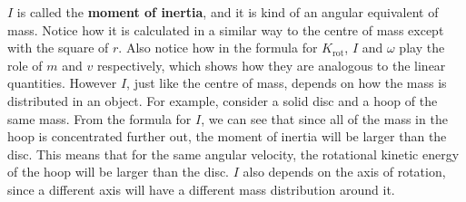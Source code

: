 \documentclass[../classical_mechanics.tex]{subfiles}
\begin{document}
            $I$ is called the \textbf{moment of inertia}, and it is kind of an angular equivalent of mass.
            Notice how it is calculated in a similar way to the centre of mass except with the square of $r$.
            Also notice how in the formula for $K_\text{rot}$, $I$ and $\omega$ play the role of $m$ and $v$ respectively, which shows how they are analogous to the linear quantities.
            However $I$, just like the centre of mass, depends on how the mass is distributed in an object.
            For example, consider a solid disc and a hoop of the same mass.
            From the formula for $I$, we can see that since all of the mass in the hoop is concentrated further out, the moment of inertia will be larger than the disc.
            This means that for the same angular velocity, the rotational kinetic energy of the hoop will be larger than the disc.
            $I$ also depends on the axis of rotation, since a different axis will have a different mass distribution around it.
\end{document}
